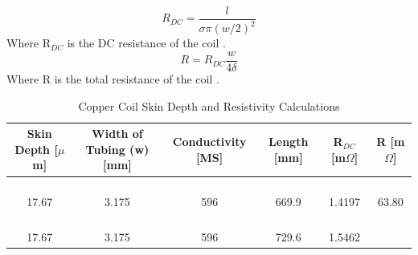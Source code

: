 \documentclass[12pt]{article}
\begin{document}
\begin{equation}
R_{DC} = \frac{l}{\sigma\pi(w/2)^2}
\end{equation}
Where R$_{DC}$ is the DC resistance of the coil \cite{optCoilSize}.
\begin{equation}
R = R_{DC}\frac{w}{4\delta}
\end{equation}
Where R is the total resistance of the coil \cite{optCoilSize}.

\begin{table}[h!]
\centering
\caption{Copper Coil Skin Depth and Resistivity Calculations}
\begin{tabular}{| c | c | c | c | c | c |}
\hline
\parbox{0.150\linewidth}{\centering Skin Depth [$\mu$m]} & \parbox{0.125\linewidth}{\centering 
Width of Tubing (w) [mm]
} & \parbox{0.150\linewidth}{\centering 
Conductivity [MS]
} & \parbox{0.100\linewidth}{\centering 
Length [mm]
} & \parbox{0.125\linewidth}{\centering 
R$_{DC}$ [m$\Omega$]
} & \parbox{0.125\linewidth}{\centering 
R [m$\Omega$]
}\\ \hline
\parbox{0.150\linewidth}{\hfill \\
17.67
\\} & \parbox{0.125\linewidth}{\hfill \\
3.175
\\} & \parbox{0.150\linewidth}{\hfill \\
596
\\} & \parbox{0.125\linewidth}{\hfill \\
669.9
\\} & \parbox{0.125\linewidth}{\hfill \\
1.4197
\\} & \parbox{0.125\linewidth}{\hfill \\
63.80
\\}\\ \hline
\parbox{0.150\linewidth}{\hfill \\
17.67
\\} & \parbox{0.125\linewidth}{\hfill \\
3.175
\\} & \parbox{0.150\linewidth}{\hfill \\
596
\\} & \parbox{0.125\linewidth}{\hfill \\
729.6
\\} & \parbox{0.125\linewidth}{\hfill \\
1.5462
\\} & \parbox{0.125\linewidth}{\hfill \\
}
\end{tabular}
\end{table}
\end{document}
